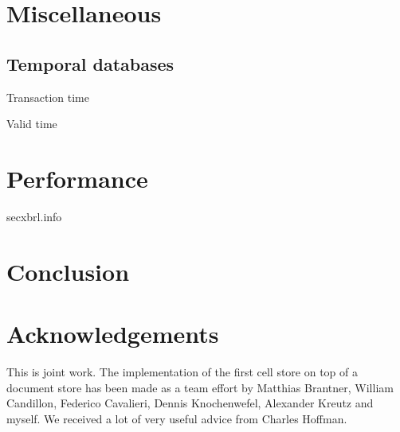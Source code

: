 \documentclass{vldb}
\begin{document}
\section{Miscellaneous}

\subsection{Temporal databases}

Transaction time

Valid time

\section{Performance}

secxbrl.info

\section{Conclusion}

\section{Acknowledgements}

This is joint work. The implementation of the first cell store on top of a document store has been made as a team effort by Matthias Brantner, William Candillon, Federico Cavalieri, Dennis Knochenwefel, Alexander Kreutz and myself. We received a lot of very useful advice from Charles Hoffman.





\end{document}
